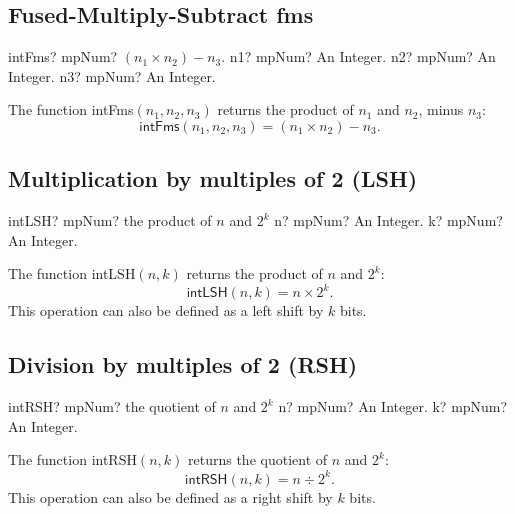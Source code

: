 \subsection{Fused-Multiply-Subtract fms}

\begin{mpFunctionsExtract}
	\mpFunctionThree
	{intFms? mpNum? $(n_1 \times n_2) - n_3$.}
	{n1? mpNum? An Integer.}
	{n2? mpNum? An Integer.}
	{n3? mpNum? An Integer.}
\end{mpFunctionsExtract}

\vspace{0.3cm}
The function \textsf{intFms$(n_1, n_2, n_3)$} returns the product of $n_1$ and $n_2$, minus $n_3$: 
\begin{equation}
	\textsf{intFms}(n_1, n_2, n_3) =(n_1 \times n_2) - n_3.
\end{equation}



\subsection{Multiplication by multiples of 2 (LSH)}

\begin{mpFunctionsExtract}
	\mpFunctionTwo
	{intLSH? mpNum? the product of $n$ and $2^k$}
	{n? mpNum? An Integer.}
	{k? mpNum? An Integer.}
\end{mpFunctionsExtract}

\vspace{0.3cm}
The function \textsf{intLSH$(n, k)$} returns the product of $n$ and $2^k$: 
\begin{equation}
	\textsf{intLSH}(n, k) =n \times 2^k.
\end{equation}
This operation can also be defined as a left shift by $k$ bits.





\subsection{Division by multiples of 2 (RSH)}

\begin{mpFunctionsExtract}
	\mpFunctionTwo
	{intRSH? mpNum? the quotient of $n$ and $2^k$}
	{n? mpNum? An Integer.}
	{k? mpNum? An Integer.}
\end{mpFunctionsExtract}

\vspace{0.3cm}
The function \textsf{intRSH$(n, k)$} returns the quotient of $n$ and $2^k$: 
\begin{equation}
	\textsf{intRSH}(n, k) =n \div 2^k.
\end{equation}
This operation can also be defined as a right shift by $k$ bits.






